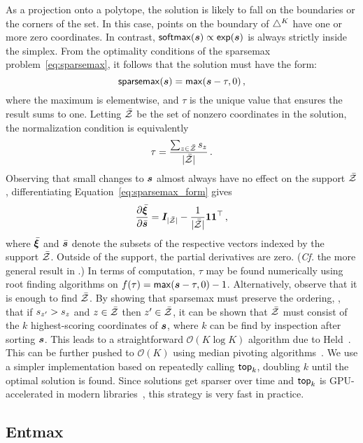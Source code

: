 As a projection onto a polytope, the solution is likely to fall on the
boundaries or the corners of the set. In this case, points on the boundary of
$\simplex^K$ have one or more zero coordinates. In contrast, $\softmax(\s)
    \propto \exp(\s)$ is always strictly inside the simplex.
From the optimality conditions of the sparsemax problem~\eqref{eq:sparsemax},
it follows that the solution must have the form:
\begin{equation}\label{eq:sparsemax_form}
    \sparsemax(\s) = \max(\s - \tau, 0)\,,
\end{equation}
where the maximum is elementwise, and $\tau$ is the unique value that
ensures the result sums to one.
Letting $\bar{\ZZ}$ be the set of nonzero coordinates in the solution,
the normalization condition is equivalently
\begin{equation}
    \tau = \frac{\sum_{z \in \bar{\ZZ}} \ss_z}{|\bar{\ZZ}|}\,.
\end{equation}
Observing that small changes to $\s$ almost always have no effect on the support
$\bar{\ZZ}$, differentiating Equation~\ref{eq:sparsemax_form} gives
\begin{equation}
    \pfrac{\bar{\pv}}{\bar{\s}} = \bm{I}_{|\bar{\ZZ}|} - \frac{1}{|\bar{\ZZ}|}
    \bm{11}^\top\,,
\end{equation}
where $\bar{\pv}$ and ${\bar{\s}}$ denote the subsets of the respective vectors
indexed by the support $\bar{\ZZ}$. Outside of the support, the partial
derivatives are zero. (\emph{Cf.} the more general result in \citet[Proposition
    2]{entmax}.)
In terms of computation, $\tau$ may be found numerically using root finding
algorithms on $f(\tau) = \max(\s - \tau, 0) - 1$.
Alternatively, observe that it is enough to find $\bar{\ZZ}$. By showing that
sparsemax must preserve the ordering, \ie, that if $\ss_{z'} > \ss_z$ and $z \in
    \bar{\ZZ}$ then $z' \in \bar{\ZZ}$, it can be shown that $\bar{\ZZ}$ must
consist of the $k$ highest-scoring coordinates of $\s$, where $k$ can be find by
inspection after sorting $\s$. This leads to a straightforward $\mathcal{O}(K
    \log K)$ algorithm due to Held~\citep[pp.~16--17]{Held1974}. This can be further pushed to
$\mathcal{O}(K)$ using median pivoting algorithms~\citep{Condat2016, entmax}. We use
a simpler implementation based on repeatedly calling $\topk$,
doubling $k$ until the optimal solution is found. Since solutions get sparser
over time and $\topk$ is GPU-accelerated
in modern libraries~\citep{pytorch}, this strategy is very fast in practice.

\subsection{Entmax}\label{sec:entmax_bg}

